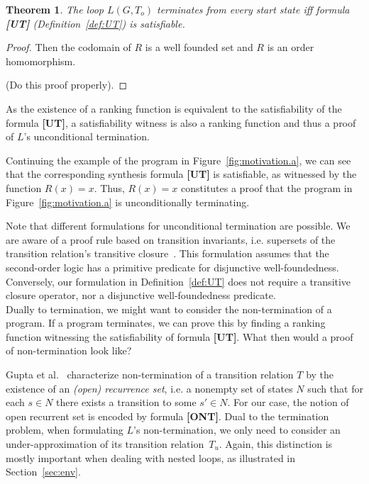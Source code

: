 \documentclass[preprint]{sigplanconf}
\newtheorem{theorem}{Theorem}
\theoremstyle{definition}
\begin{document}
\begin{theorem}
\label{thm:ut}
 The loop $L(G, T_o)$ terminates from every start state iff formula {\bf [UT]} (Definition~\ref{def:UT}) is
 satisfiable.
\end{theorem}

\begin{proof}
 Then the codomain of $R$ is a well founded set and $R$ is an order homomorphism.

 (Do this proof properly).
\end{proof}

As the existence of a ranking function is equivalent to the satisfiability
of the formula {\bf [UT]}, a satisfiability witness is also a ranking
function and thus a proof of $L$'s unconditional termination.

Continuing the example of the program in Figure~\ref{fig:motivation.a}, we
can see that the corresponding synthesis formula {\bf [UT]} is satisfiable,
as witnessed by the function $R(x) = x$.  Thus, $R(x) = x$ constitutes a
proof that the program in Figure~\ref{fig:motivation.a} is unconditionally
terminating.

Note that different formulations for unconditional termination are possible. 
We are aware of a proof rule based on transition invariants, i.e.  supersets
of the transition relation's transitive
closure~\cite{DBLP:conf/pldi/GrebenshchikovLPR12}.  This formulation assumes
that the second-order logic has a primitive predicate for disjunctive
well-foundedness.  Conversely, our formulation in Definition~\ref{def:UT}
does not require a transitive closure operator, nor a disjunctive
well-foundedness predicate.  \\

Dually to termination, we might want to consider the non-termination of a program.  If a program terminates,
we can prove this by finding a ranking function %
witnessing the satisfiability of formula {\bf[UT]}.  What then would a proof of non-termination look like?

Gupta et al.~\cite{DBLP:conf/popl/GuptaHMRX08} characterize non-termination
of a transition relation $T$ by the existence of an \emph{(open) recurrence
set}, i.e.  a nonempty set of states $N$ such that for each $s \in N$ there
exists a transition to some $s'\in N$.
For our case, the notion of open recurrent set is encoded by formula {\bf [ONT]}. %
Dual to the termination problem, when formulating $L$'s non-termination, we only need to consider an under-approximation of its transition
relation~$T_u$. 
Again, this distinction is mostly important when dealing with nested loops,
as illustrated in Section~\ref{sec:env}.
\end{document}
